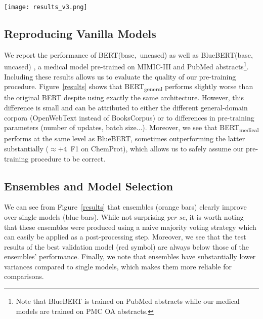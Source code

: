\documentclass[11pt]{article}
\begin{document}
\begin{figure*}[htbp]
\begin{center} 
\texttt{[image: results\_v3.png]}
\end{center}
\caption{Comparison of pre-trained models when fine-tuned on several medical tasks. For each model, the test performance of 10 random seeds is expressed as \textit{mean} $\pm$ \textit{std} and is shown in blue for single models and orange for ensembles. The performance of the best validation seed is shown in red.} \label{results}
\end{figure*}

\subsection{Reproducing Vanilla Models}

We report the performance of BERT(base,~uncased) as well as BlueBERT(base, uncased) \cite{peng2019transfer}, a medical model pre-trained on MIMIC-III and PubMed abstracts\footnote{Note that BlueBERT is trained on PubMed abstracts while our medical models are trained on PMC OA abstracts.}. Including these results allows us to evaluate the quality of our pre-training procedure. Figure~\ref{results} shows that BERT\textsubscript{general} performs slightly worse than the original BERT despite using exactly the same architecture. However, this difference is small and can be attributed to either the different general-domain corpora (OpenWebText instead of BooksCorpus) or to differences in pre-training parameters (number of updates, batch size...). Moreover, we see that BERT\textsubscript{medical} performs at the same level as BlueBERT, sometimes outperforming the latter substantially ($\approx+4$~F1 on ChemProt), which allows us to safely assume our pre-training procedure to be correct.

\subsection{Ensembles and Model Selection}

We can see from Figure~\ref{results} that ensembles (orange bars) clearly improve over single models (blue bars). While not surprising \textit{per se}, it is worth noting that these ensembles were produced using a naive majority voting strategy which can easily be applied as a post-processing step. Moreover, we see that the test results of the best validation model (red symbol) are always below those of the ensembles' performance. Finally, we note that ensembles have substantially lower variances compared to single models, which makes them more reliable for comparisons.
\end{document}
